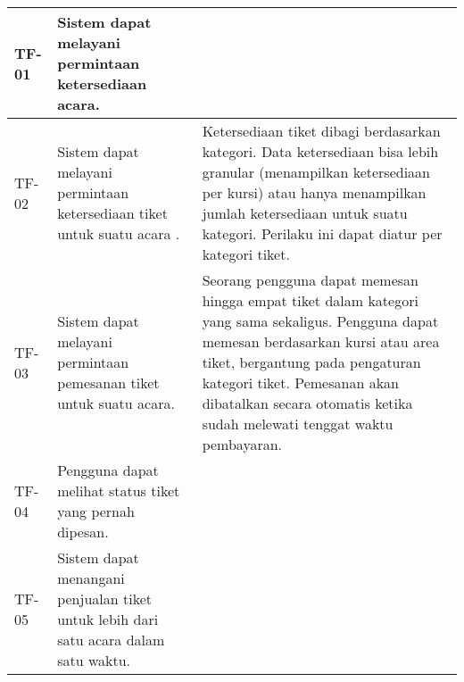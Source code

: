 \begin{longtable}{|l|p{}|p{}|}
    \hline
    \endlastfoot

    \hline
    TF-01       & Sistem dapat melayani permintaan ketersediaan acara.                                                           &                                                                                                                                                                                                                                                                                                                                                       \\
    \hline
    \hline
    TF-02       & Sistem dapat melayani permintaan ketersediaan tiket untuk suatu acara .                                        & Ketersediaan tiket dibagi berdasarkan kategori. Data ketersediaan bisa lebih granular (menampilkan ketersediaan per kursi) atau hanya menampilkan jumlah ketersediaan untuk suatu kategori. Perilaku ini dapat diatur per kategori tiket.                                                                                                             \\
    \hline
    \hline
    TF-03       & Sistem dapat melayani permintaan pemesanan tiket untuk suatu acara.                                            & Seorang pengguna dapat memesan hingga empat tiket dalam kategori yang sama sekaligus. Pengguna dapat memesan berdasarkan kursi atau area tiket, bergantung pada pengaturan kategori tiket. Pemesanan akan dibatalkan secara otomatis ketika sudah melewati tenggat waktu pembayaran.                                                                  \\
    \hline
    \hline
    TF-04       & Pengguna dapat melihat status tiket yang pernah dipesan.                                                       &                                                                                                                                                                                                                                                                                                                                                       \\
    \hline
    TF-05       & Sistem dapat menangani penjualan tiket untuk lebih dari satu acara dalam satu waktu.                           &                                                                                                                                                                                                                                                                                                                                                       \\

\end{longtable}
